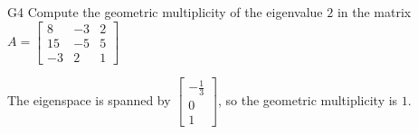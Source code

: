 \documentclass{sbgLAsemi}
\begin{document}
\begin{problem}{G4}
Compute the geometric multiplicity of the eigenvalue $2$ in the matrix $A=\begin{bmatrix}8 & -3 & 2 \\ 15 & -5 & 5 \\ -3 & 2 & 1\end{bmatrix}$
\end{problem}
\begin{solution}
The eigenspace is spanned by $\begin{bmatrix} -\frac{1}{3} \\ 0 \\ 1 \end{bmatrix}$, so the geometric multiplicity is $1$.
\end{solution}
\end{document}
